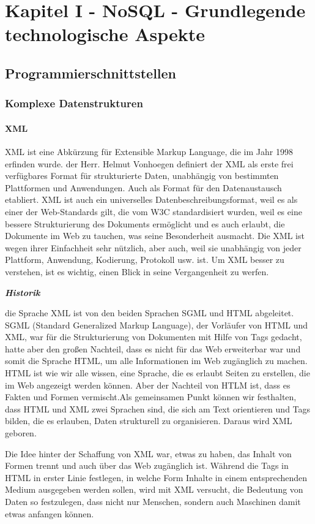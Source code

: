 \chapter{Kapitel I - NoSQL - Grundlegende technologische Aspekte}
\setcounter{section}{7}
\section{Programmierschnittstellen}

\subsection{Komplexe Datenstrukturen}
\subsubsection{XML}
XML ist eine Abkürzung für Extensible Markup Language, die im Jahr 1998 erfinden wurde. der Herr. Helmut Vonhoegen definiert der XML als erste frei verfügbares Format für strukturierte Daten, unabhängig von bestimmten Plattformen und Anwendungen. Auch als Format für den Datenaustausch etabliert. XML ist auch ein universelles Datenbeschreibungsformat, weil es als einer der Web-Standards gilt, die vom W3C standardisiert wurden, weil es eine bessere Strukturierung des Dokuments ermöglicht und es auch erlaubt, die Dokumente im Web zu tauchen, was seine Besonderheit ausmacht. Die XML ist wegen ihrer Einfachheit sehr nützlich, aber auch, weil sie unabhängig von jeder Plattform, Anwendung, Kodierung, Protokoll usw. ist. Um XML besser zu verstehen, ist es wichtig, einen Blick in seine Vergangenheit zu werfen.

\textit{\textbf{Historik}}

die Sprache XML ist von den beiden Sprachen SGML und HTML abgeleitet. SGML (Standard Generalized Markup Language), der Vorläufer von HTML und XML, war für die Strukturierung von Dokumenten mit Hilfe von Tags gedacht, hatte aber den großen Nachteil, dass es nicht für das Web erweiterbar war und somit die Sprache HTML, um alle Informationen im Web zugänglich zu machen.  HTML ist wie wir alle wissen, eine Sprache, die es erlaubt Seiten zu erstellen, die im Web angezeigt werden können. Aber der Nachteil von HTLM ist, dass es Fakten und Formen vermischt.Als gemeinsamen Punkt können wir festhalten, dass HTML und XML zwei Sprachen sind, die sich am Text orientieren und Tags bilden, die es erlauben, Daten strukturell zu organisieren. Daraus wird XML geboren. 

Die Idee hinter der Schaffung von XML war, etwas zu haben, das Inhalt von Formen trennt und auch über das Web zugänglich ist. Während die Tags in HTML in erster Linie festlegen, in welche Form Inhalte in einem entsprechenden Medium ausgegeben werden sollen, wird mit XML versucht, die Bedeutung von Daten so festzulegen, dass nicht nur Menschen, sondern auch Maschinen damit etwas anfangen können.\cite{helmut32}

